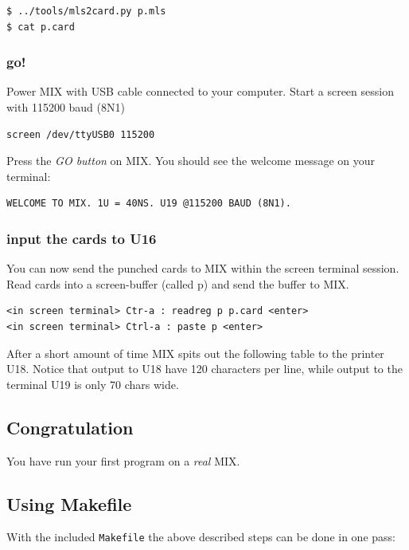 \documentclass[a4paper,ngerman]{scrartcl}
\begin{document}
\begin{lstlisting}[numbers=none,frame=none]
$ ../tools/mls2card.py p.mls
$ cat p.card
\end{lstlisting}



\subsubsection{go!}
Power MIX with USB cable connected to your computer.
Start a screen session with 115200 baud (8N1)
\begin{lstlisting}[numbers=none,frame=none]
screen /dev/ttyUSB0 115200
\end{lstlisting}

Press the \textit{GO button} on MIX. You should see the welcome message on your terminal:
\begin{lstlisting}
WELCOME TO MIX. 1U = 40NS. U19 @115200 BAUD (8N1).                    
\end{lstlisting}

\subsubsection{input the cards to U16}
You can now send the punched cards to MIX within the screen terminal session.
Read cards into a screen-buffer (called p) and send the buffer to MIX.

\begin{lstlisting}[numbers=none,frame=none]
<in screen terminal> Ctr-a : readreg p p.card <enter>
<in screen terminal> Ctrl-a : paste p <enter>
\end{lstlisting}

After a short amount of time MIX spits out the following table to the printer U18. Notice that output to U18 have 120 characters per line, while output to the terminal U19 is only 70 chars wide.



\subsection{Congratulation}
You have run your first program on a \textit{real} MIX.

\subsection{Using Makefile}
With the included \lstinline|Makefile| the above described steps can be done in one pass:
\end{document}
